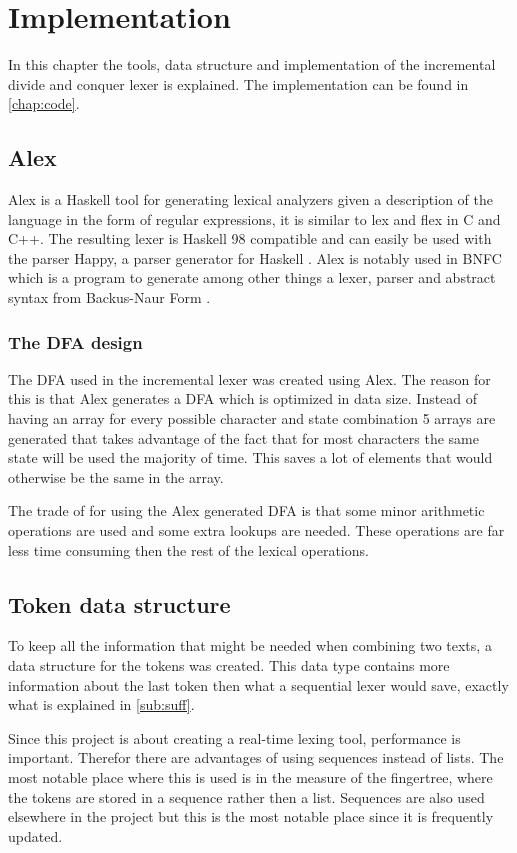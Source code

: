 \chapter{Implementation}
In this chapter the tools, data structure and implementation of the incremental
divide and conquer lexer is explained. The implementation can be found in
\cref{chap:code}.

\section{Alex}
Alex is a Haskell tool for generating lexical analyzers given a
description of the language in the form of regular expressions, it is similar to
lex and flex in C and C++. The resulting lexer is Haskell 98 compatible and can
easily be used with the parser Happy, a parser generator for Haskell \cite{alex}.
Alex is notably used in BNFC which is a program to generate among other things a
lexer, parser and abstract syntax from Backus-Naur Form \cite{bnfc}.

\subsection{The DFA design}
The DFA used in the incremental lexer was created using Alex. The reason for
this is that Alex generates a DFA which is optimized in data size. Instead of
having an array for every possible character and state combination 5 arrays are
generated that takes advantage of the fact that for most characters the same
state will be used the majority of time. This saves a lot of elements that
would otherwise be the same in the array.

The trade of for using the Alex generated DFA is that some minor arithmetic
operations are used and some extra lookups are needed. These operations
are far less time consuming then the rest of the lexical operations.

\section{Token data structure}
To keep all the information that might be needed when combining two texts, a data
structure for the tokens was created. This data type contains more information
about the last token then what a sequential lexer would save, exactly what is
explained in \cref{sub:suff}.

Since this project is about creating a real-time lexing tool, performance is
important. Therefor there are advantages of using sequences instead of lists.
The most notable place where this is used is in the measure of the fingertree,
where the tokens are stored in a sequence rather then a list. Sequences are also
used elsewhere in the project but this is the most notable place since it is
frequently updated.

